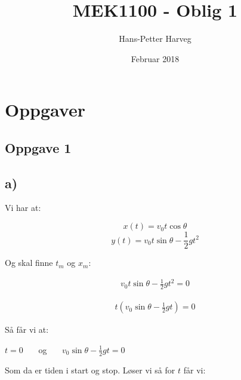 \documentclass{article}
\title{MEK1100 - Oblig 1}
\author{Hans-Petter Harveg}
\date{Februar 2018}
\begin{document}
\maketitle

%
%

\section*{Oppgaver}


\bigskip

\subsection*{Oppgave 1}

%
%

\subsection*{a)}

\begin{flushleft}
Vi har at:
\end{flushleft}

\begin{equation*}
x(t) = v_0 t \cos{\theta}
\end{equation*}
\begin{equation*}
y(t) = v_0 t \sin{\theta} - \frac{1}{2}g t^2
\end{equation*}

\begin{flushleft}
Og skal finne \(t_m\) og \(x_m\):
\end{flushleft}

\begin{align*}
v_0 t \sin{\theta} - \frac{1}{2}gt^2 = 0
\end{align*}

\begin{align*}
t(v_0 \sin{\theta} - \frac{1}{2}gt) = 0
\end{align*}

\begin{flushleft}
Så får vi at:
\end{flushleft}

\begin{center}
\(t = 0\) \ \ \ og \ \ \ \(v_0 \sin{\theta} - \frac{1}{2}gt = 0\)
\end{center}

\bigskip

\begin{flushleft}
Som da er tiden i start og stop. Løser vi så for \(t\) får vi:
\end{flushleft}
\end{document}
